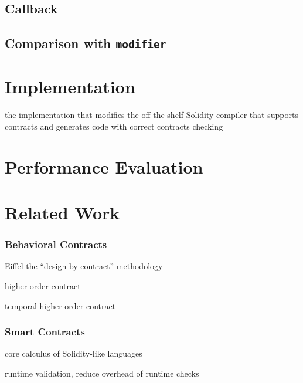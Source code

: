 \documentclass[acmsmall,review,anonymous]{acmart}\settopmatter{printfolios=true,printccs=false,printacmref=false}
\begin{document}
\subsection{Callback}

\subsection{Comparison with \texttt{modifier}}


\section{Implementation}

the implementation that modifies the off-the-shelf Solidity compiler that
supports contracts and generates code with correct contracts checking


\section{Performance Evaluation}

\section{Related Work}

\subsubsection*{\textbf{Behavioral Contracts}}

Eiffel the ``design-by-contract'' methodology \cite{DBLP:books/ph/Meyer91, DBLP:conf/tools/Meyer98a}

higher-order contract \cite{DBLP:conf/icfp/FindlerF02}

temporal higher-order contract \cite{DBLP:conf/icfp/DisneyFM11}

\subsubsection*{\textbf{Smart Contracts}}

core calculus of Solidity-like languages \cite{Sergey2021, DBLP:conf/esorics/BartolettiGM19, DBLP:conf/fc/CrafaPZ19}

runtime validation, reduce overhead of runtime checks \cite{DBLP:conf/pldi/LiCL20}
\end{document}
